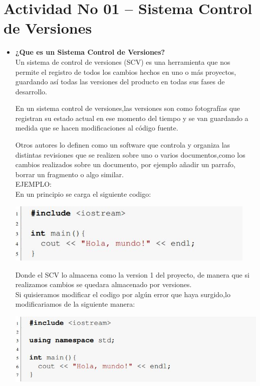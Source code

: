 \section{Actividad No 01 – Sistema Control de Versiones} 

\begin{itemize} %
\item \textbf{¿Que es un Sistema Control de Versiones?}\\

Un sistema de control de versiones (SCV) es una herramienta que nos permite el registro de todos los cambios hechos en uno o más proyectos, guardando así todas las versiones del producto en todas sus fases de desarrollo.
	
En un sistema control de versiones,las versiones son como fotografías que registran su estado actual en ese momento del tiempo y se van guardando a medida que se hacen modificaciones al código fuente.
	
Otros autores lo definen como un software que controla y organiza las
distintas revisiones que se realizen sobre uno o varios documentos,como los cambios realizados sobre un documento,
por ejemplo añadir un parrafo, borrar un fragmento o algo similar.\\

EJEMPLO:\\

En un principio se carga el siguiente codigo:\\

\begin{center}
\includegraphics[width=12cm]{./Imagenes/actividad0101} 
\end{center}
	
Donde el SCV lo almacena como la version 1 del proyecto, de manera que si realizamos cambios se quedara almacenado por versiones.\\
	
Si quisieramos modificar el codigo por algún error que haya surgido,lo modificariamos de la siguiente manera:\\

\begin{center}
\includegraphics[width=13cm]{./Imagenes/actividad0102} 
\end{center}
	

\end{itemize}
